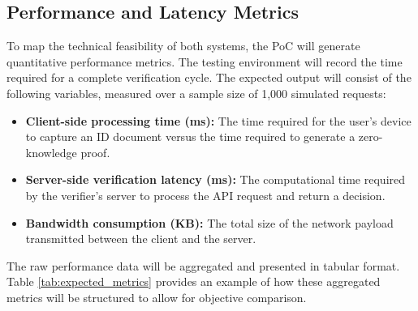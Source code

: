 \documentclass [english]{hogent-article}
\begin{document}
    
    
    \subsection{Performance and Latency Metrics}
    
    To map the technical feasibility of both systems, the PoC will generate quantitative performance metrics. The testing environment will record the time required for a complete verification cycle. The expected output will consist of the following variables, measured over a sample size of 1,000 simulated requests:
    
    \begin{itemize}
        
        \item \textbf{Client-side processing time (ms):} The time required for the user's device to capture an ID document versus the time required to generate a zero-knowledge proof.
        
        \item \textbf{Server-side verification latency (ms):} The computational time required by the verifier's server to process the API request and return a decision.
        
        \item \textbf{Bandwidth consumption (KB):} The total size of the network payload transmitted between the client and the server.
        
    \end{itemize}
    
    
    
    The raw performance data will be aggregated and presented in tabular format. Table \ref{tab:expected_metrics} provides an example of how these aggregated metrics will be structured to allow for objective comparison.
    
    
    
    
\end{document}
